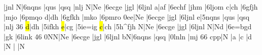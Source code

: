 \temps\notes|\Tqbh jnl\enotes
\barre\notes{}\hlp N|\tqbL6nqns\enotes
\temps\notes|\Tqbl qus\enotes
\temps\notes\sk\DEP|\Tqbl qsq\enotes
\temps\notes\soupir|\Tqbl nlj\enotes
\barre\notes\LPED\wh N|\dsoupir\dqbh Ne\enotes
\temps\notes|\tqbH6ecge\enotes
\temps\notes|\Tqbh jgl\enotes
\temps\notes\sk\DEP|\tqbH6ljnl\enotes
\barre\notes\LPED\wh a|\dsoupir\dqbh af\enotes
\temps\notes|\tqbH6echf\enotes
\temps\notes|\Tqbh jhm\enotes
\temps\notes\sk\DEP|\tqbH6ljom\enotes
\barre\notes\LPED\wh c|\dsoupir\dqbh ch\enotes
\temps\notes|\tqbH6gfjh\enotes
\temps\notes|\Tqbh mjo\enotes
\temps\notes\sk\DEP|\tqbH6pmqo\enotes
\barre\notes\LPED\wh d|\dsoupir\dqbh dh\enotes
\temps\notes|\tqbH6gfkh\enotes
\temps\notes|\Tqbh mko\enotes
\temps\notes\sk\DEP|\tqbH6pmro\enotes
\barre\notes\LPED\itenl0e\wh e|\dsoupir\dqbh Ne\enotes
\temps\notes|\tqbH6ecge\enotes
\temps\notes|\Tqbh jgl\enotes
\temps\notes|\tqbH6ljnl\enotes
\barre\notes{}\wh e|\tqbL5nqns\enotes
\temps\notes|\Tqbl qus\enotes
\temps\notes|\Tqbl qsq\enotes
\temps\notes\sk\DEP|\Tqbl nlj\enotes
\troistemps\changecontext{}36\relax
\addspace{-0.3\elemskip}\relax
\notes\LPED\hl d|\dsoupir\dqbh dh\enotes
\temps\notes\sk\DEP|\tqbH5ifkh\enotes
\temps\notes\LPED\hl e|\dsoupir\dqbh cg\enotes
\temps\notes\sk\DEP|\tqbH5ie{=i}g\enotes
\temps\notes\LPED\hl c|\dsoupir\dqbh ch\enotes
\temps\notes\sk\DEP|\tqbH5h{^f}jh\enotes
\deuxtemps\changecontext   \addspace{-0.5\elemskip}\relax
\notes\LPED\wh N|\dsoupir\dqbh Ne\enotes
\temps\notes|\tqbH6ecge\enotes
\temps\notes|\Tqbh jgl\enotes
\temps\notes\sk\DEP|\tqbH6ljnl\enotes
\barre\notes\LPED\wh N|\dsoupir\dqbh Nd\enotes
\temps\notes|\tqbH6e{=b}gd\enotes
\temps\notes|gk\enotes
\temps\notes\sk\DEP|\tqbH6link\enotes
\alaligne{}46\relax
\notes\LPED\itenu0N\wh N|\dsoupir\dqbh Ne\enotes
\temps\notes|\tqbH6ecge\enotes
\temps\notes|\Tqbh jgl\enotes
\temps\notes|\tqbH6ljnl\enotes
\barre\notes\pointdorgue b\wh N|\tqbL6nqns\enotes
\temps\notes|\Tqbl qsq\enotes
\temps\notes|\tqbL0lnln\enotes
\temps\notes\sk\DEP|\pointdorgue m\ql j\sk\enotes
\barre{}66\relax
\notes\zcharnote c{\ppff pp}\bassC|\hu N\enotes
\temps\notes\bassC|\hu a\enotes
\barre\notes\bassC|\hu c\enotes
\temps\notes\bassC|\hu d\enotes
\troistemps\changecontext
\notes\LPED\soupir|\wh N\enotes
\temps\notes\BassC\sk\soupir\enotes
\temps\notes\hpause\sk|\hpause\enotes
\deuxtemps\changecontext\notes\bassC|\hu N\enotes
